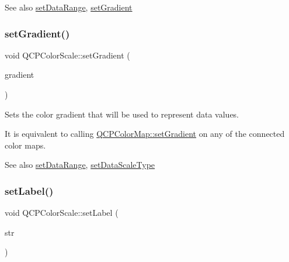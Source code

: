 \begin{DoxySeeAlso}{See also}
\mbox{\hyperlink{class_q_c_p_color_scale_abe88633003a26d1e756aa74984587fef}{set\+Data\+Range}}, \mbox{\hyperlink{class_q_c_p_color_scale_a1f29583bb6f1e7f473b62fb712be3940}{set\+Gradient}} 
\end{DoxySeeAlso}
\mbox{\label{class_q_c_p_color_scale_a1f29583bb6f1e7f473b62fb712be3940}} 
\subsubsection{\texorpdfstring{set\+Gradient()}{setGradient()}}
{\footnotesize\ttfamily void Q\+C\+P\+Color\+Scale\+::set\+Gradient (\begin{DoxyParamCaption}\item[{const \mbox{\hyperlink{class_q_c_p_color_gradient}{Q\+C\+P\+Color\+Gradient}} \&}]{gradient }\end{DoxyParamCaption})}

Sets the color gradient that will be used to represent data values.

It is equivalent to calling \mbox{\hyperlink{class_q_c_p_color_map_a7313c78360471cead3576341a2c50377}{Q\+C\+P\+Color\+Map\+::set\+Gradient}} on any of the connected color maps.

\begin{DoxySeeAlso}{See also}
\mbox{\hyperlink{class_q_c_p_color_scale_abe88633003a26d1e756aa74984587fef}{set\+Data\+Range}}, \mbox{\hyperlink{class_q_c_p_color_scale_aeb6107d67dd7325145b2498abae67fc3}{set\+Data\+Scale\+Type}} 
\end{DoxySeeAlso}
\mbox{\label{class_q_c_p_color_scale_aee124ae8396320cacf8276e9a0fbb8ce}} 
\subsubsection{\texorpdfstring{set\+Label()}{setLabel()}}
{\footnotesize\ttfamily void Q\+C\+P\+Color\+Scale\+::set\+Label (\begin{DoxyParamCaption}\item[{const Q\+String \&}]{str }\end{DoxyParamCaption})}

